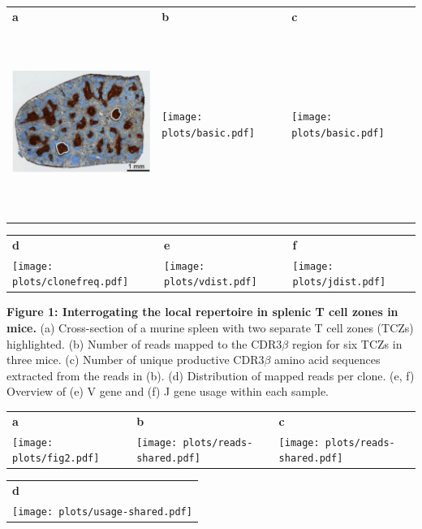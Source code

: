 \documentclass[a4paper]{article}
\newcommand{\s}[1]{{\bfseries\Large #1}}
\begin{document}
\sffamily

\begin{tabular}{lll}
\s{a} & \s{b} & \s{c}  \\
\includegraphics[angle=0,height=2.4in]{images/spleen.png} &
	{\texttt{[image: plots/basic.pdf]}} &
\texttt{[image: plots/basic.pdf]} \\
\end{tabular}

\begin{tabular}{lll}
\s{d} & \s{e} & \s{f} \\
\texttt{[image: plots/clonefreq.pdf]} & 
\texttt{[image: plots/vdist.pdf]} & 
\texttt{[image: plots/jdist.pdf]}
\end{tabular}

{\bfseries Figure 1: Interrogating the local repertoire in splenic T cell zones in mice.} (a) Cross-section of a murine spleen with two separate T cell zones (TCZs) highlighted. (b) Number of reads mapped to the CDR3$\beta$ region for six TCZs in three mice. (c) Number of unique productive CDR3$\beta$ amino acid sequences extracted from the reads in (b). (d) Distribution of mapped reads per clone. (e, f) Overview of (e) V gene and (f) J gene usage within each sample.

\newpage

\begin{tabular}{lll}
\s{a} & \s{b} & \s{c} \\[-1em]
\texttt{[image: plots/fig2.pdf]} & 
{\texttt{[image: plots/reads-shared.pdf]}} & 
\texttt{[image: plots/reads-shared.pdf]}
\end{tabular}


\begin{tabular}{l}
\s{d} \\[-1em]
\texttt{[image: plots/usage-shared.pdf]}
\end{tabular}
\end{document}
